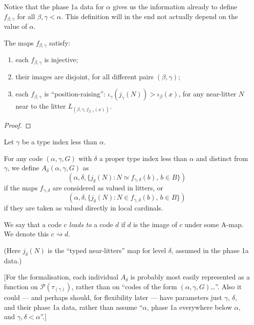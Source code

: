 Notice that the phase 1a data for $\alpha$ gives us the information already to define $f_{\beta,\gamma}$ for all $\beta, \gamma < \alpha$.  This definition will in the end not actually depend on the value of $\alpha$.

\begin{lemma}
  \label{lem:f-map-properties}
  \leanok
  The maps $f_{\beta,\gamma}$ satisfy:
  \begin{enumerate}
  \item each $f_{\beta,\gamma}$ is injective;
  \item their images are disjoint, for all different pairs $(\beta,\gamma)$;
  \item each $f_{\beta,\gamma}$ is “position-raising”: $\iota_\gamma(j_\gamma(N)) > \iota_\beta(x)$, for any near-litter $N$ near to the litter $L_{(\beta,\gamma,f_{\beta,\gamma}(x))}$.
  \end{enumerate}
\end{lemma}
\begin{proof}\leanok\end{proof}

\begin{definition}
\label {def:a-map}
\leanok
Let $\gamma$ be a type index less than $\alpha$.

For any code $(\alpha,\gamma,G)$ with $\delta$ a proper type index less than $\alpha$ and distinct from $\gamma$, we define
$A_\delta(\alpha,\gamma,G)$ as
$$(\alpha,\delta,\{ j_\delta(N) : N \simeq f_{\gamma,\delta}(b),\, b \in B \})$$
if the maps $f_{\gamma,\delta}$ are considered as valued in litters, or
$$(\alpha,\delta,\{ j_\delta(N) : N \in f_{\gamma,\delta}(b),\, b \in B \})$$
if they are taken as valued directly in local cardinals.

We say that a code $c$ \emph{leads to} a code $d$ if $d$ is the image of $c$ under some A-map. We denote this $c \rightsquigarrow d$.

(Here $j_\delta(N)$ is the “typed near-litters” map for level $\delta$, assumed in the phase 1a data.)

[For the formalisation, each individual $A_\delta$ is probably most easily represented as a function on $\mathcal P(\tau_(\gamma))$, rather than on “codes of the form $(\alpha,\gamma,G)$…”.  Also it could — and perhaps should, for flexibility later — have parameters just $\gamma$, $\delta$, and their phase 1a data, rather than assume “$\alpha$, phase 1a everywhere below $\alpha$, and $\gamma,\delta < \alpha$”.]
\end{definition}

